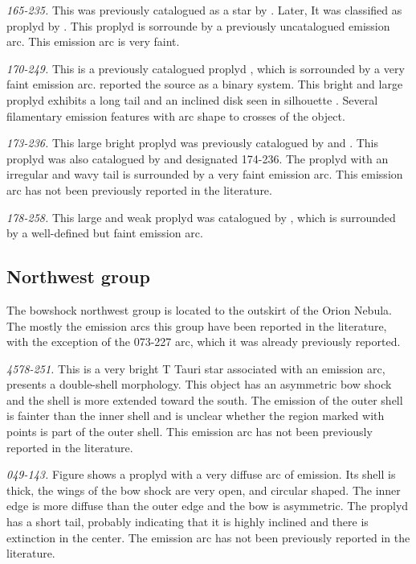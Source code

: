 \documentclass[iop, apj]{emulateapj}
\begin{document}
\textit{165-235.} This was previously catalogued as a star by \citet{ODell:1996a}. Later, It was classified as proplyd by \citet{Ricci:2008a}. This proplyd is sorrounde by a previously uncatalogued emission arc. This emission arc is very faint.

\textit{170-249.} This is a previously catalogued proplyd \citet{ODell:1996a, Ricci:2008a}, which is sorrounded by a very faint emission arc. \citet{Ricci:2008a} reported the source as a binary system.  This bright and large proplyd exhibits a long tail and an inclined disk seen in silhouette \citep{Bally:2000a}. Several  filamentary emission features with arc shape to crosses of the object. 

\textit{173-236.} This large bright proplyd was previously catalogued by \citet{ODell:1996a} and \citet{Ricci:2008a}. This proplyd was also catalogued by \citet{Bally:2000a} and designated 174-236. The proplyd with an irregular and wavy tail \citep[see][]{Bally:2000a} is surrounded by a very faint  emission arc. This emission arc has not been previously reported in the literature.   

\textit{178-258.}  This large and weak proplyd was catalogued by \citet{Ricci:2008a}, which is surrounded by a well-defined but faint emission arc.

\clearpage
\subsection{Northwest group}
\label{sec:nw-group}



The bowshock northwest group is located to the outskirt of the Orion Nebula. The mostly the emission arcs this group have been reported in the literature, with the exception of the  073-227 arc, which it was already previously reported.    

\textit{4578-251.} This  is a very bright T Tauri star associated with an emission arc, presents a double-shell morphology. This object has an asymmetric bow shock and the shell is more extended toward the south. The emission of the outer shell is fainter than the inner shell and is unclear whether the region marked with points is part of the outer shell. This emission arc has not been previously reported in the literature. 

\textit{049-143.} Figure shows a proplyd with a very diffuse arc of emission. Its shell is thick, the wings of the bow shock are very open, and circular shaped. The inner edge is more diffuse than the outer edge and the bow is asymmetric. The  proplyd has a short tail, probably indicating that it is highly inclined and there is extinction in the center. The emission arc has not been previously reported in the literature.  
 
\end{document}
